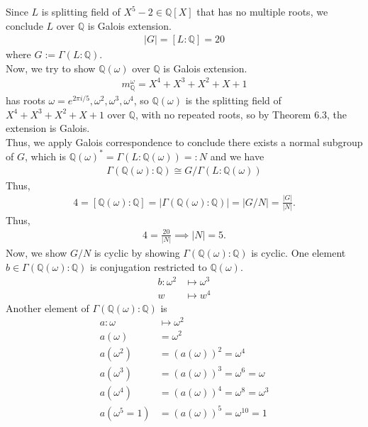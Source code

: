 \documentclass[12pt,english]{article}
\begin{document}
Since $L$ is splitting field of $X^5 - 2 \in \mathbb{Q}[X]$ that has no multiple roots,
we conclude $L$ over $\mathbb{Q}$ is Galois extension.
\begin{align}
    |G| = [L:\mathbb{Q}] = 20
\end{align}
where $G := \Gamma(L:\mathbb{Q})$.\\
Now, we try to show $\mathbb{Q}(\omega)$ over $\mathbb{Q}$ is Galois extension.
\begin{align}
    m_{\mathbb{Q}}^{\omega} = X^4 + X^3 + X^2 + X + 1
\end{align}
has roots $\omega = e^{2 \pi i/5}, \omega^2, \omega^3, \omega^4$,
so $\mathbb{Q}(\omega)$ is the splitting field of $X^4 + X^3 + X^2 + X + 1$
over $\mathbb{Q}$, with no repeated roots, so by Theorem 6.3, 
the extension is Galois.\\
Thus, we apply Galois correspondence to conclude
there exists a normal subgroup of $G$, which is 
$\mathbb{Q}(\omega)^{*} = \Gamma(L:\mathbb{Q}(\omega)) =: N$ and we have
\begin{align}
    \Gamma(\mathbb{Q}(\omega):\mathbb{Q}) \cong G/\Gamma(L:\mathbb{Q}(\omega)) 
\end{align}
Thus,
\begin{align}
    4 = [\mathbb{Q}(\omega):\mathbb{Q}] = \lvert \Gamma(\mathbb{Q}(\omega):\mathbb{Q}) \rvert = \lvert G/N \rvert = \frac{ |G| }{ |N| }.
\end{align}
Thus,
\begin{align}
    4 = \frac{ 20 }{ \lvert N \rvert } \implies \lvert N \rvert = 5.
\end{align}
Now, we show $G/N$ is cyclic by showing $\Gamma(\mathbb{Q}(\omega):\mathbb{Q})$ is cyclic.
One element $b \in \Gamma(\mathbb{Q}(\omega):\mathbb{Q})$
is conjugation restricted to $\mathbb{Q}(\omega)$. 
\begin{align}
    b: \omega^2 &\mapsto \omega^3 \\
    w &\mapsto w^4
\end{align}
Another element of $\Gamma(\mathbb{Q}(\omega):\mathbb{Q})$ is
\begin{align}
    a: \omega &\mapsto \omega^2\\
    a(\omega) &= \omega^2\\
    a(\omega^2) &= \left( a(\omega) \right)^2 = \omega^4\\
    a(\omega^3) &= \left( a(\omega) \right)^3 = \omega^6 = \omega\\
    a(\omega^4) &= \left( a(\omega) \right)^4 = \omega^8 = \omega^3\\
    a(\omega^5 = 1) &= \left( a(\omega) \right)^5 = \omega^{10} = 1
\end{align}
\end{document}
